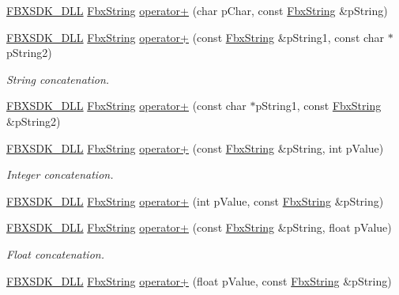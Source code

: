 \begin{DoxyCompactItemize}
\hyperlink{fbxarch_8h_a25d1298b33c31da5dbed969e0d4b4bc1}{F\+B\+X\+S\+D\+K\+\_\+\+D\+LL} \hyperlink{class_fbx_string}{Fbx\+String} \hyperlink{class_fbx_string_ab5928d3d3a3b0d6e39136a02c7b7014e}{operator+} (char p\+Char, const \hyperlink{class_fbx_string}{Fbx\+String} \&p\+String)
\item 
\hyperlink{fbxarch_8h_a25d1298b33c31da5dbed969e0d4b4bc1}{F\+B\+X\+S\+D\+K\+\_\+\+D\+LL} \hyperlink{class_fbx_string}{Fbx\+String} \hyperlink{class_fbx_string_a1711d58fcd5d75ee4e66ff08f3bcda05}{operator+} (const \hyperlink{class_fbx_string}{Fbx\+String} \&p\+String1, const char $\ast$p\+String2)
\begin{DoxyCompactList}\small\item\em String concatenation. \end{DoxyCompactList}\item 
\hyperlink{fbxarch_8h_a25d1298b33c31da5dbed969e0d4b4bc1}{F\+B\+X\+S\+D\+K\+\_\+\+D\+LL} \hyperlink{class_fbx_string}{Fbx\+String} \hyperlink{class_fbx_string_a743035bdca2dc41d72054a797b5ab609}{operator+} (const char $\ast$p\+String1, const \hyperlink{class_fbx_string}{Fbx\+String} \&p\+String2)
\item 
\hyperlink{fbxarch_8h_a25d1298b33c31da5dbed969e0d4b4bc1}{F\+B\+X\+S\+D\+K\+\_\+\+D\+LL} \hyperlink{class_fbx_string}{Fbx\+String} \hyperlink{class_fbx_string_a47e12177b25793bc4dbee111b17b433d}{operator+} (const \hyperlink{class_fbx_string}{Fbx\+String} \&p\+String, int p\+Value)
\begin{DoxyCompactList}\small\item\em Integer concatenation. \end{DoxyCompactList}\item 
\hyperlink{fbxarch_8h_a25d1298b33c31da5dbed969e0d4b4bc1}{F\+B\+X\+S\+D\+K\+\_\+\+D\+LL} \hyperlink{class_fbx_string}{Fbx\+String} \hyperlink{class_fbx_string_ac72b5d26f6740fac673665c33ae9ac7f}{operator+} (int p\+Value, const \hyperlink{class_fbx_string}{Fbx\+String} \&p\+String)
\item 
\hyperlink{fbxarch_8h_a25d1298b33c31da5dbed969e0d4b4bc1}{F\+B\+X\+S\+D\+K\+\_\+\+D\+LL} \hyperlink{class_fbx_string}{Fbx\+String} \hyperlink{class_fbx_string_aac0e3ec29f0758f9359132067e1f9bf7}{operator+} (const \hyperlink{class_fbx_string}{Fbx\+String} \&p\+String, float p\+Value)
\begin{DoxyCompactList}\small\item\em Float concatenation. \end{DoxyCompactList}\item 
\hyperlink{fbxarch_8h_a25d1298b33c31da5dbed969e0d4b4bc1}{F\+B\+X\+S\+D\+K\+\_\+\+D\+LL} \hyperlink{class_fbx_string}{Fbx\+String} \hyperlink{class_fbx_string_ad24f53b332e3ad680ee80783e39fd554}{operator+} (float p\+Value, const \hyperlink{class_fbx_string}{Fbx\+String} \&p\+String)

\end{DoxyCompactItemize}

